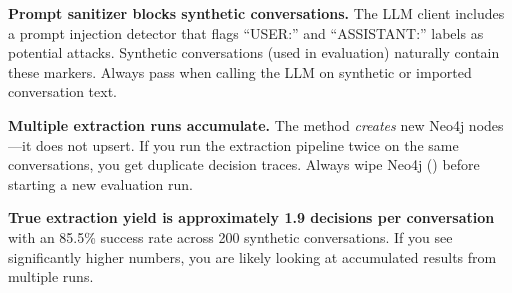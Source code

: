 \begin{warning}
\textbf{Prompt sanitizer blocks synthetic conversations.}
The LLM client includes a prompt injection detector that flags
``USER:'' and ``ASSISTANT:'' labels as potential attacks.  Synthetic
conversations (used in evaluation) naturally contain these markers.
Always pass  when calling the LLM on
synthetic or imported conversation text.
\end{warning}

\begin{warning}
\textbf{Multiple extraction runs accumulate.}
The  method \emph{creates} new Neo4j nodes---it
does not upsert.  If you run the extraction pipeline twice on the same
conversations, you get duplicate decision traces.  Always wipe Neo4j
() before starting a new evaluation run.
\end{warning}

\begin{warning}
\textbf{True extraction yield is approximately 1.9 decisions per
conversation} with an 85.5\% success rate across 200 synthetic
conversations.  If you see significantly higher numbers, you are likely
looking at accumulated results from multiple runs.
\end{warning}

